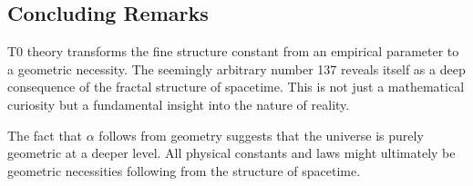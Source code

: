 \documentclass[12pt,a4paper]{article}
\theoremstyle{definition}
\begin{document}
	\subsection{Concluding Remarks}
	
	T0 theory transforms the fine structure constant from an empirical parameter to a geometric necessity. The seemingly arbitrary number 137 reveals itself as a deep consequence of the fractal structure of spacetime. This is not just a mathematical curiosity but a fundamental insight into the nature of reality.
	
	The fact that $\alpha$ follows from geometry suggests that the universe is purely geometric at a deeper level. All physical constants and laws might ultimately be geometric necessities following from the structure of spacetime.
	
\end{document}
